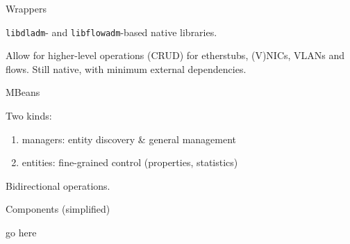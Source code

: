 \documentclass{beamer}
\begin{document}
	\begin{frame}{Wrappers}

		\texttt{libdladm}- and \texttt{libflowadm}-based native libraries.

		\medskip

		Allow for higher-level operations (CRUD) for etherstubs, (V)NICs, VLANs and flows. Still native, with minimum external dependencies.
	
	\end{frame}


	\begin{frame}{MBeans}

		Two kinds:
		
		\begin{enumerate}
			\item managers: entity discovery \& general management
			\item entities: fine-grained control (properties, statistics)
		\end{enumerate}

		Bidirectional operations.
	
	\end{frame}


	\begin{frame}{Components (simplified)}

		go here
	
	\end{frame}
\end{document}
